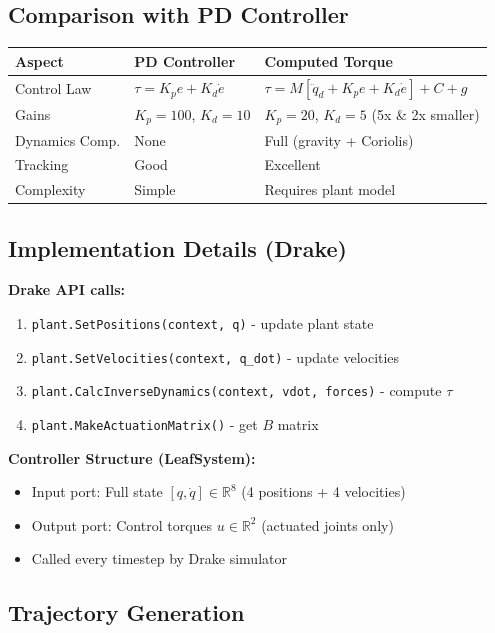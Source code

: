 \subsection*{Comparison with PD Controller}

\begin{tabular}{|l|l|l|}
\hline
\textbf{Aspect} & \textbf{PD Controller} & \textbf{Computed Torque} \\
\hline
Control Law & $\tau = K_p e + K_d \dot{e}$ & $\tau = M[\ddot{q}_d + K_p e + K_d \dot{e}] + C + g$ \\
\hline
Gains & $K_p=100$, $K_d=10$ & $K_p=20$, $K_d=5$ (5x \& 2x smaller) \\
\hline
Dynamics Comp. & None & Full (gravity + Coriolis) \\
\hline
Tracking & Good & Excellent \\
\hline
Complexity & Simple & Requires plant model \\
\hline
\end{tabular}

\subsection*{Implementation Details (Drake)}

\textbf{Drake API calls:}
\begin{enumerate}
\item \texttt{plant.SetPositions(context, q)} - update plant state
\item \texttt{plant.SetVelocities(context, q\_dot)} - update velocities  
\item \texttt{plant.CalcInverseDynamics(context, vdot, forces)} - compute $\tau$
\item \texttt{plant.MakeActuationMatrix()} - get $B$ matrix
\end{enumerate}

\textbf{Controller Structure (LeafSystem):}
\begin{itemize}
\item Input port: Full state $[q, \dot{q}] \in \mathbb{R}^{8}$ (4 positions + 4 velocities)
\item Output port: Control torques $u \in \mathbb{R}^{2}$ (actuated joints only)
\item Called every timestep by Drake simulator
\end{itemize}

\subsection*{Trajectory Generation}

